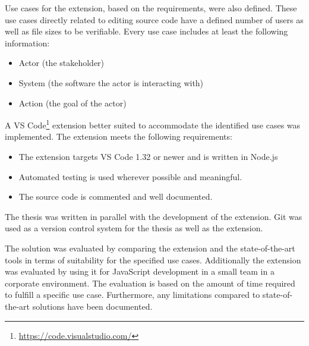 Use cases for the extension, based on the requirements, were also defined. These use cases directly related to editing source code have a defined number of users as well as file sizes to be verifiable. 
Every use case includes at least the following information:
\begin{itemize}
    \item Actor (the stakeholder)
    \item System (the software the actor is interacting with)
    \item Action (the goal of the actor)
\end{itemize}
A VS Code\footnote{\href{https://code.visualstudio.com/}{https://code.visualstudio.com/}} extension better suited to accommodate the identified use cases was implemented.
The extension meets the following requirements:
\begin{itemize}
    \item The extension targets VS Code 1.32 or newer and is written in Node.js
    \item Automated testing is used wherever possible and meaningful.
    \item The source code is commented and well documented.
\end{itemize}
The thesis was written in parallel with the development of the extension. Git was used as a version control system for the thesis as well as the extension.

The solution was evaluated by comparing the extension and the state-of-the-art tools in terms of suitability for the specified use cases. Additionally the extension was evaluated by using it for JavaScript development in a small team in a corporate environment. 
The evaluation is based on the amount of time required to fulfill a specific use case.
Furthermore, any limitations compared to state-of-the-art solutions have been documented.